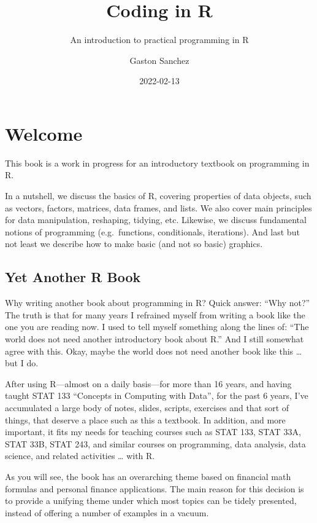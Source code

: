 \documentclass[
]{book}
\title{Coding in R}
\subtitle{An introduction to practical programming in R}
\author{Gaston Sanchez}
\date{2022-02-13}
\begin{document}
\maketitle

{
\setcounter{tocdepth}{1}
\tableofcontents
}
\hypertarget{welcome}{%
\chapter*{Welcome}\label{welcome}}

This book is a work in progress for an introductory textbook on programming in R.

In a nutshell, we discuss the basics of R, covering properties of data objects,
such as vectors, factors, matrices, data frames, and lists. We also cover
main principles for data manipulation, reshaping, tidying, etc. Likewise, we
discuss fundamental notions of programming (e.g.~functions, conditionals,
iterations). And last but not least we describe how to make basic (and not so
basic) graphics.

\hypertarget{yet-another-r-book}{%
\section*{Yet Another R Book}\label{yet-another-r-book}}

Why writing another book about programming in R? Quick answer: ``Why not?''
The truth is that for many years I refrained myself from writing a book like
the one you are reading now. I used to tell myself something along the lines
of: ``The world does not need another introductory book about R.'' And I still
somewhat agree with this. Okay, maybe the world does not need another book
like this \ldots{} but I do.

After using R---almost on a daily basis---for more than 16 years, and
having taught STAT 133 ``Concepts in Computing with Data'', for the past 6 years,
I've accumulated a large body of notes, slides, scripts, exercises and that
sort of things, that deserve a place such as this a textbook. In addition, and
more important, it fits my needs for teaching courses such as STAT 133, STAT 33A,
STAT 33B, STAT 243, and similar courses on programming, data analysis, data
science, and related activities \ldots{} with R.

As you will see, the book has an overarching theme based on financial math
formulas and personal finance applications. The main reason for this decision
is to provide a unifying theme under which most topics can be tidely presented,
instead of offering a number of examples in a vacuum.
\end{document}
